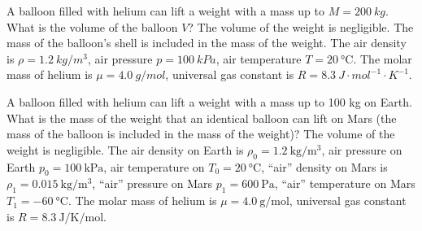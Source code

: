 \documentclass[11pt]{article}
\begin{document}
\probeng
A balloon filled with helium can lift a weight with a mass up to $M=\SI{200}{kg}$. What is the volume of the balloon $V$? The volume of the weight is negligible. The mass of the balloon’s shell is included in the mass of the weight. The air density is $\rho=\SI{1.2}{kg\per m^3}$, air pressure $p=\SI{100}{kPa}$, air temperature $T=\SI{20}{\degreeCelsius}$. The molar mass of helium is $\mu=\SI{4.0}{g\per mol}$, universal gas constant is $R=\SI{8.3}{J\cdot mol^{-1}\cdot K^{-1}}$.
\probend
\bigskip


\probeng
A balloon filled with helium can lift a weight with a mass up to 100 kg on Earth. What is the mass of the weight that an identical balloon can lift on Mars (the mass of the balloon is included in the mass of the weight)? The volume of the weight is negligible. The air density on Earth is $\rho_0=\SI{1.2}{\kilogram\per\meter^3}$, air pressure on Earth $p_0=\SI{100}{\kilo\pascal}$, air temperature on $T_0=\SI{20}{\degreeCelsius}$, “air” density on Mars is $\rho_1=\SI{0.015}{\kilogram\per\meter^3}$, “air” pressure on Mars $p_1=\SI{600}{\pascal}$, “air” temperature on Mars $T_1=\SI{-60}{\degreeCelsius}$. The molar mass of helium is $\mu=\SI{4.0}{\gram\per\mole}$, universal gas constant is $R=\SI{8.3}{\joule\per\kelvin\per\mole}$.
\probend
\bigskip

\end{document}
